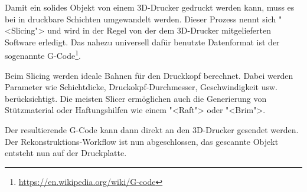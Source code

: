 Damit ein solides Objekt von einem 3D-Drucker gedruckt werden kann, muss es bei
in druckbare Schichten umgewandelt werden. Dieser Prozess nennt sich "<Slicing">
und wird in der Regel von der dem 3D-Drucker mitgelieferten Software erledigt.
%
%
Das nahezu universell dafür benutzte Datenformat ist der sogenannte
G-Code\footnote{\url{https://en.wikipedia.org/wiki/G-code}}.

Beim Slicing werden ideale Bahnen für den Druckkopf berechnet. Dabei werden
Parameter wie Schichtdicke, Druckokpf-Durchmesser, Geschwindigkeit usw.
berücksichtigt. Die meisten Slicer ermöglichen auch die Generierung von
Stützmaterial oder Haftungshilfen wie einem "<Raft"> oder "<Brim">.

Der resultierende G-Code kann dann direkt an den 3D-Drucker gesendet werden. Der
Rekonstruktions-Workflow ist nun abgeschlossen, das gescannte Objekt entsteht
nun auf der Druckplatte.
